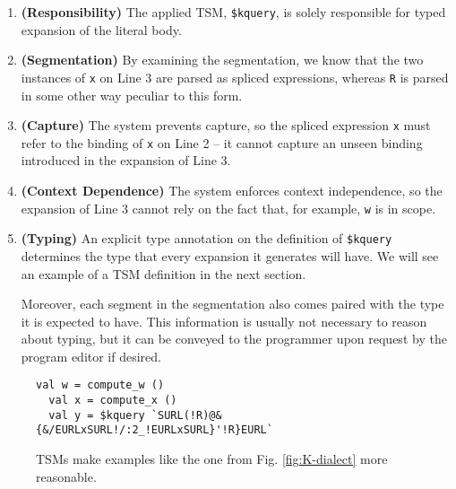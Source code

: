 \documentclass[acmlarge,review,anonymous]{acmart}\settopmatter{printfolios=true}
\newcommand{\li}[1]{\lstinline{#1}}
\begin{document}
\begin{enumerate}
\item \textbf{(Responsibility)} The applied TSM, \li{$kquery}, is solely responsible for typed expansion of the literal body. 
\item \textbf{(Segmentation)} By examining the segmentation, we know that the two instances of \li{x} on Line 3 are parsed as spliced expressions, whereas \li{R} is parsed in some other way peculiar to this form.
\item \textbf{(Capture)} The system prevents capture, so the spliced expression \li{x} must refer to the binding of \li{x} on Line 2 -- it cannot capture an unseen binding introduced in the expansion of Line 3.
\item \textbf{(Context Dependence)} The system enforces context independence, so the expansion of Line 3 cannot  rely on the fact that, for example, \li{w} is in scope.
\item \textbf{(Typing)} An explicit type annotation on the definition of \li{$kquery} determines the type that every expansion it generates will have. We will see an example of a TSM definition in the next section. 

Moreover, each segment in the segmentation also comes paired with the type it is expected to have. This information is usually not necessary to reason about typing, but it can be conveyed to the programmer upon request by the program editor if desired. %
\end{enumerate}


\begin{figure}
\begin{lstlisting}[numbers=none,xleftmargin=0px]
  val w = compute_w ()
  val x = compute_x ()
  val y = $kquery `SURL(!R)@&{&/EURLxSURL!/:2_!EURLxSURL}'!R}EURL`
\end{lstlisting}
\vspace{-5px}
\caption{TSMs make examples like the one from Fig. \ref{fig:K-dialect} more reasonable.}
\vspace{-5px}
\label{fig:K-tsm-example}
\end{figure}

\end{document}
